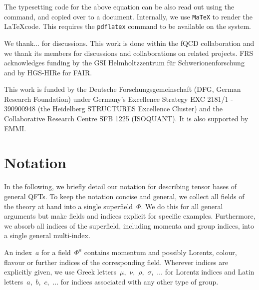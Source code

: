 \documentclass[10pt,prd,nofootinbib,superscriptaddress,twocolumn]{revtex4-2}
\newcommand{\mathem}{\mmaInlineCell{Code}}
\newcommand{\bash}{\lstinline[language=Bash]}
\begin{document}
The typesetting code for the above equation can be also read out using the \mathem{\mmaDef{FTex}} command, and copied over to a document. Internally, we use \texttt{MaTeX} \cite{szabolcs_horvat_2024_10828124} to render the \LaTeX code. This requires the \bash{pdflatex} command to be available on the system.

\begin{acknowledgments}
We thank... for discussions. This work is done within the fQCD collaboration \cite{fQCD} and we thank its members for discussions and collaborations on related projects.
FRS acknowledges funding by the GSI Helmholtzzentrum f\"ur Schwerionenforschung and by HGS-HIRe for FAIR.

This work is funded by the Deutsche Forschungsgemeinschaft (DFG, German Research Foundation) under Germany’s Excellence Strategy EXC 2181/1 - 390900948 (the Heidelberg STRUCTURES Excellence Cluster) and the Collaborative Research Centre SFB 1225 (ISOQUANT). It is also supported by EMMI. 
	
	
\end{acknowledgments}

\appendix


\section{Notation}
\label{app:notation}

In the following, we briefly detail our notation for describing tensor bases of general QFTs.
To keep the notation concise and general, we collect all fields of the theory at hand into a single superfield~$\Phi$. 
We do this for all general arguments but make fields and indices explicit for specific examples.
Furthermore, we absorb all indices of the superfield, including momenta and group indices, into a single general multi-index.

An index~$a$ for a field~$\Phi^a$ contains momentum and possibly Lorentz, colour, flavour or further indices of the corresponding field.
Wherever indices are explicitly given, we use Greek letters~$\mu$,~$\nu$,~$\rho$,~$\sigma$,~$\dotsc$ for Lorentz indices and Latin letters~$a$,~$b$,~$c$,~$\dotsc$ for indices associated with any other type of group. 
\end{document}
